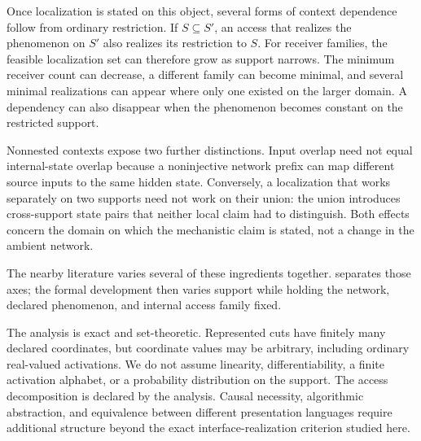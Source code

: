 Once localization is stated on this object, several forms of context dependence follow from ordinary restriction. If $S\subseteq S'$, an access that realizes the phenomenon on $S'$ also realizes its restriction to $S$. For receiver families, the feasible localization set can therefore grow as support narrows. The minimum receiver count can decrease, a different family can become minimal, and several minimal realizations can appear where only one existed on the larger domain. A dependency can also disappear when the phenomenon becomes constant on the restricted support.

Nonnested contexts expose two further distinctions. Input overlap need not equal internal-state overlap because a noninjective network prefix can map different source inputs to the same hidden state. Conversely, a localization that works separately on two supports need not work on their union: the union introduces cross-support state pairs that neither local claim had to distinguish. Both effects concern the domain on which the mechanistic claim is stated, not a change in the ambient network.

The nearby literature varies several of these ingredients together.  separates those axes; the formal development then varies support while holding the network, declared phenomenon, and internal access family fixed.

The analysis is exact and set-theoretic. Represented cuts have finitely many declared coordinates, but coordinate values may be arbitrary, including ordinary real-valued activations. We do not assume linearity, differentiability, a finite activation alphabet, or a probability distribution on the support. The access decomposition is declared by the analysis. Causal necessity, algorithmic abstraction, and equivalence between different presentation languages require additional structure beyond the exact interface-realization criterion studied here.
